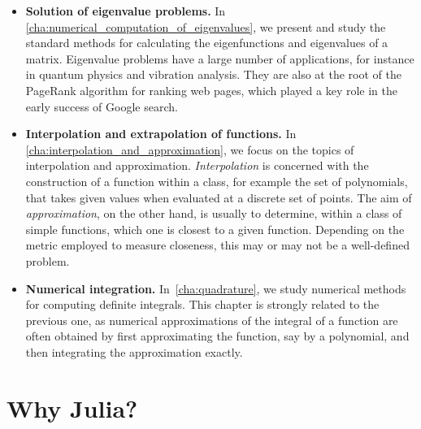 \begin{itemize}
    \item
        \textbf{Solution of eigenvalue problems.}
        In \cref{cha:numerical_computation_of_eigenvalues},
        we present and study the standard methods for calculating the eigenfunctions and eigenvalues of a matrix.
        Eigenvalue problems have a large number of applications,
        for instance in quantum physics and vibration analysis.
        They are also at the root of the PageRank algorithm for ranking web pages,
        which played a key role in the early success of Google search.

    \item
        \textbf{Interpolation and extrapolation of functions.}
        In \cref{cha:interpolation_and_approximation},
        we focus on the topics of interpolation and approximation.
        \emph{Interpolation} is concerned with the construction of a function within a class,
        for example the set of polynomials,
        that takes given values when evaluated at a discrete set of points.
        The aim of \emph{approximation}, on the other hand,
        is usually to determine, within a class of simple functions,
        which one is closest to a given function.
        Depending on the metric employed to measure closeness,
        this may or may not be a well-defined problem.

    \item
        \textbf{Numerical integration.}
        In~\cref{cha:quadrature},
        we study numerical methods for computing definite integrals.
        This chapter is strongly related to the previous one,
        as numerical approximations of the integral of a function are often obtained by first approximating the function,
        say by a polynomial, and then integrating the approximation exactly.
\end{itemize}


\section*{Why Julia?}%
\label{sec:why_julia_}

